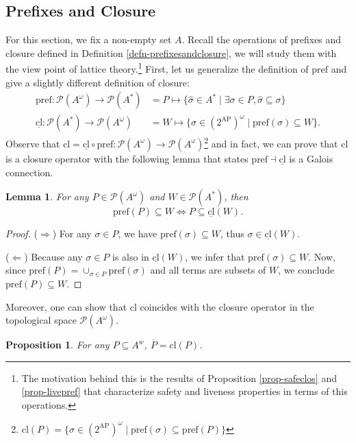 \documentclass{tufte-handout} %
\newtheorem{prop}[thm]{Proposition}
\newtheorem{lem}[thm]{Lemma}
\theoremstyle{definition}
\theoremstyle{remark}
\newcommand{\mP}{\mathcal{P}}
\newcommand{\0}{\textsf{0}}
\newcommand{\1}{\textsf{1}}
\newcommand{\AP}{\text{AP}}
\newcommand{\pref}{\text{pref}}
\newcommand{\cl}{\text{cl}}
\begin{document}
\subsection{Prefixes and Closure}
For this section, we fix a non-empty set $A$. Recall the operations of prefixes and closure defined in Definition \ref{defn-prefixesandclosure}, we will study them with the view point of lattice theory.\footnote{The motivation behind this is the results of Proposition \ref{prop-safeclos} and \ref{prop-livepref} that characterize safety and liveness properties in terms of this operations.} First, let us generalize the definition of $\pref$ and give a slightly different definition of closure:
\begin{align*}
\pref: \mP(A^{\omega}) \rightarrow \mP(A^*) &=  P \mapsto \{\hat{\sigma} \in A^* \mid \exists \sigma \in P, \hat{\sigma} \subseteq \sigma \}\\
\underline{\cl}:\mP(A^*) \rightarrow \mP(A^{\omega}) &= W \mapsto \{\sigma \in (2^{\AP})^{\omega} \mid \pref(\sigma) \subseteq W\}.
\end{align*}
Observe that $\cl = \underline{\cl} \circ \pref: \mP(A^{\omega}) \rightarrow \mP(A^{\omega})$\footnote{$\cl(P) = \{\sigma \in (2^{\AP})^{\omega} \mid \pref(\sigma) \subseteq \pref(P)\}$} and in fact, we can prove that $\cl$ is a closure operator with the following lemma that states $\pref \dashv \underline{\cl}$ is a Galois connection.
\begin{lem}
	For any $P \in \mP(A^{\omega})$ and $W \in \mP(A^*)$, then 
	\[\pref(P) \subseteq W \Leftrightarrow P \subseteq \underline{\cl}(W).\]
\end{lem}
\begin{proof}
	($\Rightarrow$) For any $\sigma \in P$, we have $\pref(\sigma) \subseteq W$, thus $\sigma \in \underline{\cl}(W)$.
	
	($\Leftarrow$) Because any $\sigma \in P$ is also in $\underline{\cl}(W)$, we infer that $\pref(\sigma) \subseteq W$. Now, since $\pref(P) = \cup_{\sigma \in P} \pref(\sigma)$ and all terms are subsets of $W$, we conclude $\pref(P) \subseteq W$.	
\end{proof}
Moreover, one can show that $\cl$ coincides with the closure operator in the topological space $\mP(A^{\omega})$.
\begin{prop}
	For any $P \subseteq A^w$, $\overline{P} = \cl(P)$.
\end{prop}
\end{document}
